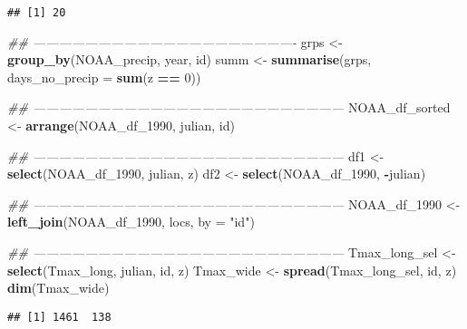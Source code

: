 \documentclass[]{book}
\newenvironment{Shaded}{\begin{snugshade}}{\end{snugshade}}
\newcommand{\CommentTok}[1]{\textcolor[rgb]{0.56,0.35,0.01}{\textit{#1}}}
\newcommand{\DataTypeTok}[1]{\textcolor[rgb]{0.13,0.29,0.53}{#1}}
\newcommand{\DecValTok}[1]{\textcolor[rgb]{0.00,0.00,0.81}{#1}}
\newcommand{\KeywordTok}[1]{\textcolor[rgb]{0.13,0.29,0.53}{\textbf{#1}}}
\newcommand{\NormalTok}[1]{#1}
\newcommand{\OperatorTok}[1]{\textcolor[rgb]{0.81,0.36,0.00}{\textbf{#1}}}
\newcommand{\StringTok}[1]{\textcolor[rgb]{0.31,0.60,0.02}{#1}}
\begin{document}
\begin{verbatim}
## [1] 20
\end{verbatim}

\begin{Shaded}
\begin{Highlighting}[]
\CommentTok{## -------------------------------------------------------------}
\NormalTok{grps <-}\StringTok{ }\KeywordTok{group_by}\NormalTok{(NOAA_precip, year, id)}
\NormalTok{summ <-}\StringTok{ }\KeywordTok{summarise}\NormalTok{(grps, }\DataTypeTok{days_no_precip =} \KeywordTok{sum}\NormalTok{(z }\OperatorTok{==}\StringTok{ }\DecValTok{0}\NormalTok{))}

\CommentTok{## ------------------------------------------------------------------------}
\NormalTok{NOAA_df_sorted <-}\StringTok{ }\KeywordTok{arrange}\NormalTok{(NOAA_df_}\DecValTok{1990}\NormalTok{, julian, id)}

\CommentTok{## ------------------------------------------------------------------------}
\NormalTok{df1 <-}\StringTok{ }\KeywordTok{select}\NormalTok{(NOAA_df_}\DecValTok{1990}\NormalTok{, julian, z)}
\NormalTok{df2 <-}\StringTok{ }\KeywordTok{select}\NormalTok{(NOAA_df_}\DecValTok{1990}\NormalTok{, }\OperatorTok{-}\NormalTok{julian)}

\CommentTok{## ------------------------------------------------------------------------}
\NormalTok{NOAA_df_}\DecValTok{1990}\NormalTok{ <-}\StringTok{ }\KeywordTok{left_join}\NormalTok{(NOAA_df_}\DecValTok{1990}\NormalTok{, locs, }\DataTypeTok{by =} \StringTok{"id"}\NormalTok{)}

\CommentTok{## ------------------------------------------------------------------------}
\NormalTok{Tmax_long_sel <-}\StringTok{ }\KeywordTok{select}\NormalTok{(Tmax_long, julian, id, z)}
\NormalTok{Tmax_wide <-}\StringTok{ }\KeywordTok{spread}\NormalTok{(Tmax_long_sel, id, z)}
\KeywordTok{dim}\NormalTok{(Tmax_wide)}
\end{Highlighting}
\end{Shaded}

\begin{verbatim}
## [1] 1461  138
\end{verbatim}

\begin{Shaded}
\end{Shaded}
\end{document}
